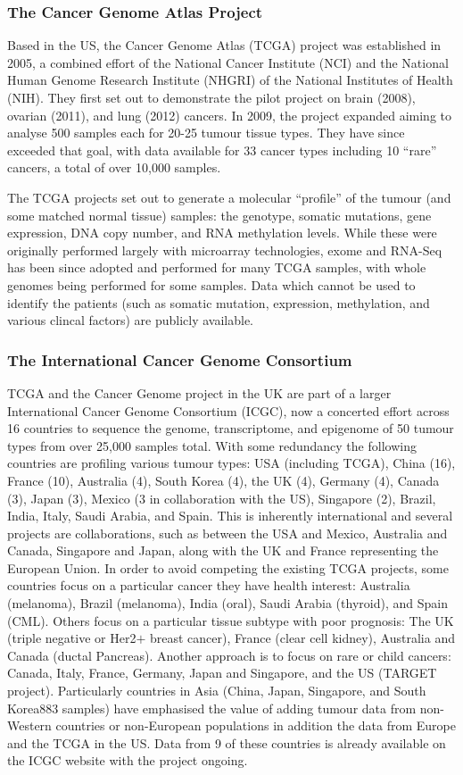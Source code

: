 \subsubsection{The Cancer Genome Atlas Project}
Based in the US, the Cancer Genome Atlas (TCGA) project was established in 2005, a combined effort of the National Cancer Institute (NCI) and the National Human Genome Research Institute (NHGRI) of the National Institutes of Health (NIH). They first set out to demonstrate the pilot project on brain (2008), ovarian (2011), and lung (2012) cancers. In 2009, the project expanded aiming to analyse 500 samples each for 20-25 tumour tissue types. They have since exceeded that goal, with data available for 33 cancer types including 10 ``rare'' cancers, a total of over 10,000 samples.

The TCGA projects set out to generate a molecular ``profile'' of the tumour (and some matched normal tissue) samples: the genotype, somatic mutations, gene expression, DNA copy number, and RNA methylation levels. While these were originally performed largely with microarray technologies, exome and RNA-Seq has been since adopted and performed for many TCGA samples, with whole genomes being performed for some samples. Data which cannot be used to identify the patients (such as somatic mutation, expression, methylation, and various clincal factors) are publicly available.

\subsubsection{The International Cancer Genome Consortium}
TCGA and the Cancer Genome project in the UK are part of a larger International Cancer Genome Consortium (ICGC), now a concerted effort across 16 countries to sequence the genome, transcriptome, and epigenome of 50 tumour types from over 25,000 samples total. With some redundancy the following countries are profiling various tumour types: USA (including TCGA), China (16), France (10), Australia (4), South Korea (4), the UK (4), Germany (4), Canada (3), Japan (3), Mexico (3 in collaboration with the US), Singapore (2),  Brazil, India, Italy, Saudi Arabia, and Spain. This is inherently international and several projects are collaborations, such as between the USA and Mexico, Australia and Canada, Singapore and Japan, along with the UK and France representing the European Union. In order to avoid competing the existing TCGA projects, some countries focus on a particular cancer they have health interest: Australia (melanoma), Brazil (melanoma), India (oral), Saudi Arabia (thyroid), and Spain (CML). Others focus on a particular tissue subtype with poor prognosis: The UK (triple negative or Her2$+$ breast cancer), France (clear cell kidney), Australia and Canada (ductal Pancreas). Another approach is to focus on rare or child cancers: Canada, Italy, France, Germany, Japan and Singapore, and the US (TARGET project). Particularly countries in Asia (China, Japan, Singapore, and South Korea883 samples) have emphasised the value of adding tumour data from non-Western countries or non-European populations in addition the data from Europe and the TCGA in the US. Data from 9 of these countries is already available on the ICGC website with the project ongoing.

